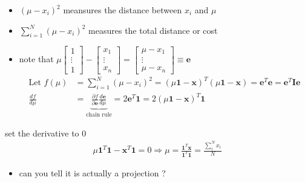 \documentclass[ignorenonframetext,]{beamer}
\providecommand{\tightlist}{%
  \setlength{\itemsep}{0pt}\setlength{\parskip}{0pt}}
\newcommand{\vv}[1]{\boldsymbol{#1}}
\begin{document}
\begin{frame}{}
\protect\hypertarget{section-7}{}

\begin{itemize}
\tightlist
\item
  \((\mu -x_i)^2\) meansures the distance between \(x_i\) and \(\mu\)
\item
  \(\sum_{i=1}^{N} (\mu -x_i)^2\) measures the total distance or cost
\item
  note that
  \(\mu\begin{bmatrix}1\\ \vdots \\1 \end{bmatrix} - \begin{bmatrix}x_1 \\\vdots \\x_n\end{bmatrix} = \begin{bmatrix}\mu-x_1 \\\vdots \\\mu-x_n\end{bmatrix} \equiv \vv{e}\)
  \begin{align*} 
  \text{Let } f(\mu) &= \sum_{i=1}^{N} (\mu -x_i)^2 = (\mu \vv{1}- \vv{x})^{T}(\mu \vv{1}- \vv{x})= \vv{e}^T\vv{e} = \vv{e}^T\vv{I}\vv{e} \\
  \frac{df}{d\mu} &=  \underbrace{\frac{\partial f}{\partial \vv{e}}\frac{d\vv{e}}{d\mu}}_{\text{chain rule}}= 2\vv{e}^T\vv{1} = 2(\mu\vv{1} - \vv{x})^T \vv{1}
  \end{align*}
\end{itemize}

\bigskip

set the derivative to 0 \begin{align*} 
\mu\vv{1}^T\vv{1} -\vv{x}^T \vv{1}= 0 \Rightarrow  \mu = \frac{\vv{1}^T\vv{x}}{\vv{1}^T\vv{1}} = \frac{\sum_{i}^N x_i}{N}
\end{align*}

\begin{itemize}
\tightlist
\item
  can you tell it is actually a projection ?
\end{itemize}

\end{frame}
\end{document}
